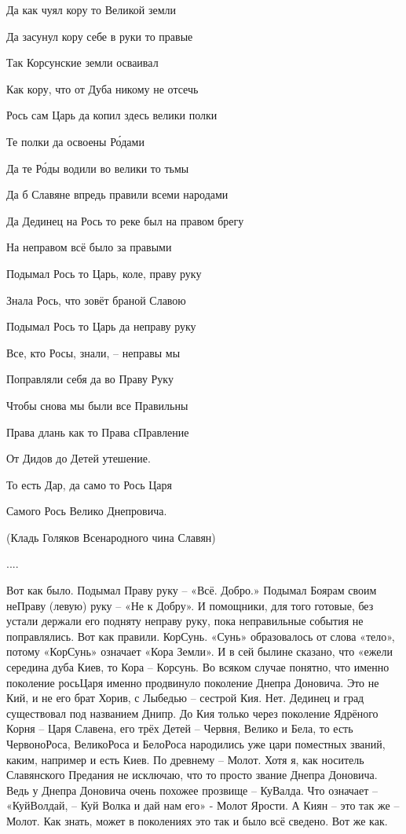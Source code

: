 \begin{itemize}
Да как чуял кору то Великой земли

Да засунул кору себе в руки то правые

Так Корсунские земли осваивал

Как кору, что от Дуба никому не отсечь

Рось сам Царь да копил здесь велики полки

Те полки да освоены Ро́дами

Да те Ро́ды водили во велики то тьмы

Да б Славяне впредь правили всеми народами

Да Дединец на Рось то реке был на правом брегу

На неправом всё было за правыми

Подымал Рось то Царь, коле, праву руку

Знала Рось, что зовёт браной Славою

Подымал Рось то Царь да неправу руку

Все, кто Росы, знали, – неправы мы

Поправляли себя да во Праву Руку

Чтобы снова мы были все Правильны

Права длань как то Права сПравление

От Дидов до Детей утешение.

То есть Дар, да само то Рось Царя

Самого Рось Велико Днепровича.

(Кладь Голяков Всенародного чина Славян)

....

Вот как было. Подымал Праву руку – «Всё. Добро.» Подымал Боярам своим неПраву
(левую) руку – «Не к Добру». И помощники, для того готовые, без устали держали
его подняту неправу руку, пока неправильные события не поправлялись. Вот как
правили. КорСунь. «Сунь» образовалось от слова «тело», потому «КорСунь»
означает «Кора Земли». И в сей былине сказано, что «ежели середина дуба Киев,
то Кора – Корсунь. Во всяком случае понятно, что именно поколение росьЦаря
именно продвинуло поколение Днепра Доновича. Это не Кий, и не его брат Хорив, с
Лыбедью – сестрой Кия. Нет. Дединец и град существовал под названием Днипр. До
Кия только через поколение Ядрёного Корня – Царя Славена, его трёх Детей –
Червня, Велико и Бела, то есть ЧервоноРоса, ВеликоРоса и БелоРоса народились
уже цари поместных званий, каким, например и есть Киев. По древнему – Молот.
Хотя я, как носитель Славянского Предания не исключаю, что то просто звание
Днепра Доновича. Ведь у Днепра Доновича очень похожее прозвище – КуВалда. Что
означает – «КуйВолдай, – Куй Волка и дай нам его» - Молот Ярости. А Киян – это
так же – Молот. Как знать, может в поколениях это так и было всё сведено. Вот
же как.


\end{itemize}
